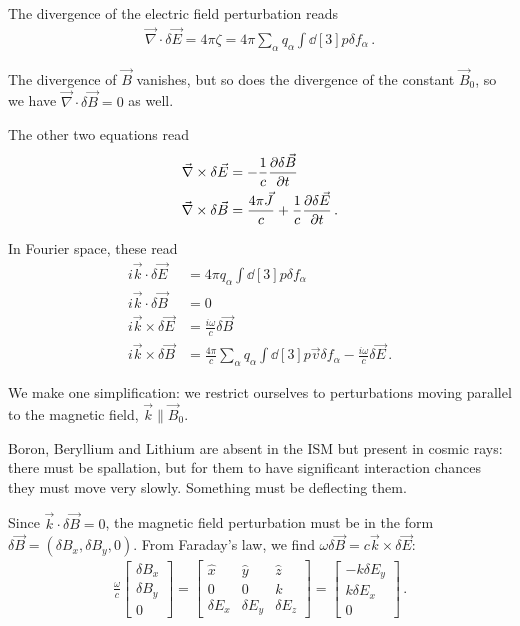 \documentclass[main.tex]{subfiles}
\begin{document}
The divergence of the electric field perturbation reads 
%
\begin{align}
\vec{\nabla} \cdot \delta \vec{E} = 4 \pi \zeta = 4 \pi \sum _{\alpha } q_\alpha \int \dd[3]{p} \delta f_\alpha 
\,.
\end{align}

The divergence of \(\vec{B}\) vanishes, but so does the divergence of the constant \(\vec{B}_0\), so we have \(\vec{\nabla} \cdot \delta \vec{B} = 0\) as well. 

The other two equations read 
%
\begin{align}
\vec{\nabla} \times \delta \vec{E} &= - \frac{1}{c} \pdv{ \delta \vec{B} }{t}  \\
\vec{\nabla} \times \delta \vec{B} &= \frac{4 \pi \vec{J}}{c} + \frac{1}{c} \pdv{ \delta \vec{E}}{t}
\,.
\end{align}

In Fourier space, these read 
%
\begin{align}
i \vec{k} \cdot \delta \vec{E} &= 4 \pi q_\alpha \int \dd[3]{p} \delta f_\alpha  \\
i \vec{k} \cdot \delta \vec{B} &= 0  \\
i \vec{k} \times \delta \vec{E} &= \frac{i \omega }{c} \delta \vec{B}  \\
i \vec{k} \times \delta \vec{B} &= \frac{4 \pi }{c} \sum _{\alpha } q_\alpha \int \dd[3]{p} \vec{v} \delta f_\alpha - \frac{i \omega }{c} \delta \vec{E}
\,.
\end{align}

We make one simplification: we restrict ourselves to perturbations moving parallel to the magnetic field, \(\vec{k} \parallel \vec{B}_0\). 

Boron, Beryllium and Lithium are absent in the ISM but present in cosmic rays: there must be spallation, but for them to have significant interaction chances they must move very slowly. Something must be deflecting them. 

Since \(\vec{k} \cdot \delta \vec{B} = 0\), the magnetic field perturbation must be in the form \(\delta \vec{B} = (\delta B_x, \delta B_y, 0)\). 
From Faraday's law, we find \(\omega \delta \vec{B} = c \vec{k} \times \delta \vec{E}\): 
%
\begin{align}
\frac{\omega}{c} \left[\begin{array}{c}
\delta B_x \\ 
\delta B_y \\ 
0
\end{array}\right]
= \left[\begin{array}{ccc}
\hat{x} & \hat{y} & \hat{z} \\ 
0 & 0 & k \\ 
\delta E_x & \delta E_y & \delta E_z
\end{array}\right]
= \left[\begin{array}{c}
- k \delta E_y \\ 
k \delta E_x \\ 
0
\end{array}\right]
\,.
\end{align}
\end{document}
